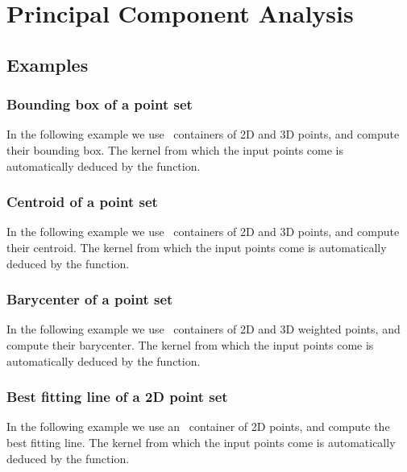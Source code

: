 \chapter{Principal Component Analysis}
\label{chap:pca}


\minitoc



\section{Examples}
\label{subsec:pca_examples}

\subsection{Bounding box of a point set}

In the following example we use \stl\ containers of 2D and 3D points, and
compute their bounding box. The kernel from which the input points
come is automatically deduced by the function.


\subsection{Centroid of a point set}

In the following example we use \stl\ containers of 2D and 3D points, and
compute their centroid. The kernel from which the input points
come is automatically deduced by the function.


\subsection{Barycenter of a point set}

In the following example we use \stl\ containers of 2D and 3D weighted points,
and compute their barycenter. The kernel from which the input points come is
automatically deduced by the function.


\subsection{Best fitting line of a 2D point set}

In the following example we use an \stl\ container of 2D points, and
compute the best fitting line. The kernel from which the input points
come is automatically deduced by the function.


